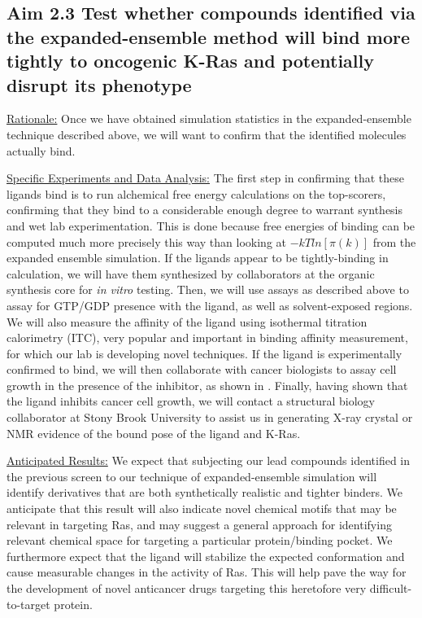 \documentclass[12pt]{article}
\begin{document}
\subsection*{Aim 2.3 Test whether compounds identified via the expanded-ensemble method will bind more tightly to oncogenic K-Ras and potentially disrupt its phenotype}

\underline{Rationale:} Once we have obtained simulation statistics in the expanded-ensemble technique described above, we will want to confirm that the identified molecules actually bind.

\underline{Specific Experiments and Data Analysis:} The first step in confirming that these ligands bind is to run alchemical free energy calculations on the top-scorers, confirming that they bind to a considerable enough degree to warrant synthesis and wet lab experimentation. This is done because free energies of binding can be computed much more precisely this way than looking at $-kT ln [\pi(k)]$ from the expanded ensemble simulation. If the ligands appear to be tightly-binding in calculation, we will have them synthesized by collaborators at the organic synthesis core for \textit{in vitro} testing. Then, we will use assays as described above to assay for GTP/GDP presence with the ligand, as well as solvent-exposed regions. We will also measure the affinity of the ligand using isothermal titration calorimetry (ITC), very popular and important in binding affinity measurement\cite{itcref}, for which our lab is developing novel techniques. If the ligand is experimentally confirmed to bind, we will then collaborate with cancer biologists to assay cell growth in the presence of the inhibitor, as shown in \cite{ostrem2013}. Finally, having shown that the ligand inhibits cancer cell growth, we will contact a structural biology collaborator at Stony Brook University to assist us in generating X-ray crystal or NMR evidence of the bound pose of the ligand and K-Ras.

\underline{Anticipated Results:} We expect that subjecting our lead compounds identified in the previous screen to our technique of expanded-ensemble simulation will identify derivatives that are both synthetically realistic and tighter binders. We anticipate that this result will also indicate novel chemical motifs that may be relevant in targeting Ras, and may suggest a general approach for identifying relevant chemical space for targeting a particular protein/binding pocket. We furthermore expect that the ligand will stabilize the expected conformation and cause measurable changes in the activity of Ras. This will help pave the way for the development of novel anticancer drugs targeting this heretofore very difficult-to-target protein.
\end{document}
